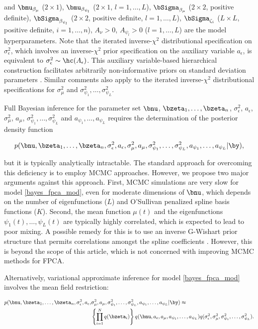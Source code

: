 \documentclass[12pt]{article}
\def\sigsqeps{\sigma^2_{\epsilon}}
\def\aeps{a_{\epsilon}}
\def\sigsqmu{\sigma^2_{\mu}}
\def\amu{a_{\mu}}
\newcommand\sigsqpsi[1]{\sigma^2_{\psi_{#1}}}
\newcommand\apsi[1]{a_{\psi_{#1}}}
\theoremstyle{plain}
\theoremstyle{definition}
\theoremstyle{remark}
\begin{document}
\noindent and $\bmu_{\beta_\mu}$ ($2 \times 1$), $\bmu_{\beta_{\psi_l}}$ ($2 \times 1$, $l = 1, \dots, L$),
$\bSigma_{\beta_\mu}$ ($2 \times 2$, positive definite), $\bSigma_{\beta_{\psi_l}}$ ($2 \times 2$, positive definite,
$l = 1, \dots, L$), $\bSigma_{\zeta_i}$ ($L \times L$, positive definite, $i = 1, \dots, n$), $A_\nu > 0$,
$A_{\psi_l} > 0$ ($l = 1, \dots, L$) are the model hyperparameters.
Note that the iterated inverse-$\chi^2$ distributional specification on $\sigsqeps$,
which involves an inverse-$\chi^2$ prior specification on the auxiliary variable $\aeps$, is equivalent to $\sigsqeps \sim
\hc (A_{\epsilon})$. This auxiliary variable-based hierarchical construction facilitates arbitrarily non-informative
priors on standard deviation parameters \cite{gelman06}. Similar comments also apply to the iterated inverse-$\chi^2$
distributional specifications for $\sigsqmu$ and $\sigsqpsi{1}, \dots, \sigsqpsi{L}$.

Full Bayesian inference for the parameter set $\bnu$, $\bzeta_1, \dots, \bzeta_n$, $\sigsqeps$, $\aeps$,
$\sigsqmu$, $\amu$, $\sigsqpsi{1}, \dots, \sigsqpsi{L}$ and $\apsi{1}, \dots, \apsi{L}$ requires the determination
of the posterior density function

\[
	p (
		\bnu, \bzeta_1, \dots, \bzeta_n, \sigsqeps, \aeps, \sigsqmu, \amu,
		\sigsqpsi{1}, \dots, \sigsqpsi{L}, \apsi{1}, \dots, \apsi{L} | \by
	),
\]

\noindent but it is typically analytically intractable. The standard approach for overcoming this deficiency is to
employ MCMC approaches. However, we propose two major arguments against this approach. First, MCMC
simulations are very slow for model \eqref{bayes_fpca_mod}, even for moderate dimensions of $\bnu$, which
depends on the number of eigenfunctions ($L$) and O'Sullivan penalized spline basis functions ($K$).
Second, the mean function $\mu (t)$ and the eigenfunctions $\psi_1 (t), \dots,
\psi_L (t)$ are typically highly correlated, which is expected to lead to poor mixing.
A possible remedy for this is to use an inverse G-Wishart prior structure that permits
correlations amongst the spline coefficients \cite{goldsmith16}. However, this is beyond the scope of this article,
which is not concerned with improving MCMC methods for FPCA.

Alternatively, variational approximate inference for model \eqref{bayes_fpca_mod} involves
the mean field restriction:

\begin{align}
\begin{split}
	p (
		\bnu, \bzeta_1, \dots, \bzeta_n, \sigsqeps, \aeps, &\sigsqmu, \amu,
		\sigsqpsi{1}, \dots, \sigsqpsi{L}, \apsi{1}, \dots, \apsi{L} | \by
	) \approx \\
		&\left\{ \prod_{i=1}^N q (\bzeta_i) \right\} q (\bnu, \aeps, \amu, \apsi{1}, \dots, \apsi{L})
		q(\sigsqeps, \sigsqmu, \sigsqpsi{1}, \dots, \sigsqpsi{L}).
\end{split}
\label{fpca_mf_min_restrn}
\end{align}
\end{document}
